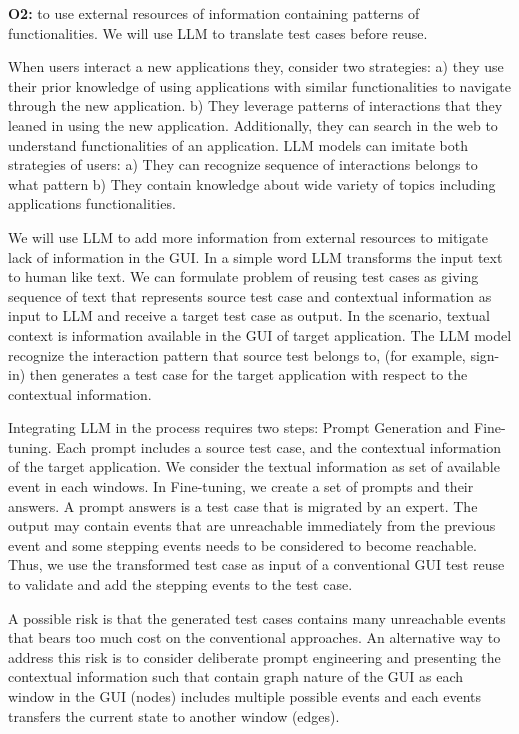 \bigskip
\noindent
\textbf{O2:} to use external resources of information containing patterns of functionalities. We will use LLM to translate test cases before reuse.

\bigskip
When users interact a new applications they, consider two strategies: 
a) they use their prior knowledge of using applications with similar functionalities to navigate through the new application. 
b) They leverage patterns of interactions that they leaned  in using the new application. 
Additionally, they can search in the web to understand functionalities of an application. 
LLM models can imitate both strategies of users:
a) They can recognize sequence of interactions belongs to what pattern
b)  They contain knowledge about wide variety of topics including applications functionalities.

\bigskip
We will use LLM to add more information from external resources to mitigate lack of information in the GUI.
In a simple word LLM transforms the input text to human like text. 
We can formulate problem of reusing test cases as giving sequence of text that represents source test case and contextual information as input to LLM and receive a target test case as output.  
In the \testreuse scenario, textual context is information available in the GUI of target application. 
The LLM model recognize the interaction pattern that source test belongs to, (for example, sign-in) then generates a test case for the target application with respect to the contextual information.

\bigskip
Integrating LLM in the \testreuse process requires two steps: Prompt Generation and Fine-tuning. 
%
Each prompt includes a source test case, and the contextual information of the target application. 
We consider the textual information as set of available event in each windows.
%
In Fine-tuning, we create a set of prompts and their answers.
A prompt answers is a test case that is migrated by an expert. 
% 
The output may contain events that are unreachable immediately from the previous event and  some stepping events needs to be considered to become reachable.
 Thus, we use the transformed test case as input of a conventional GUI test reuse to validate and add the stepping events to the test case. 


\bigskip
A possible risk is that the generated test cases contains many unreachable events that bears too much cost on the conventional \testreuse approaches.
An alternative way to address this risk is to consider deliberate prompt engineering and presenting the contextual information such that contain graph nature of the GUI as each window in the GUI (nodes) includes multiple possible events and each events transfers the current state to another window (edges).

